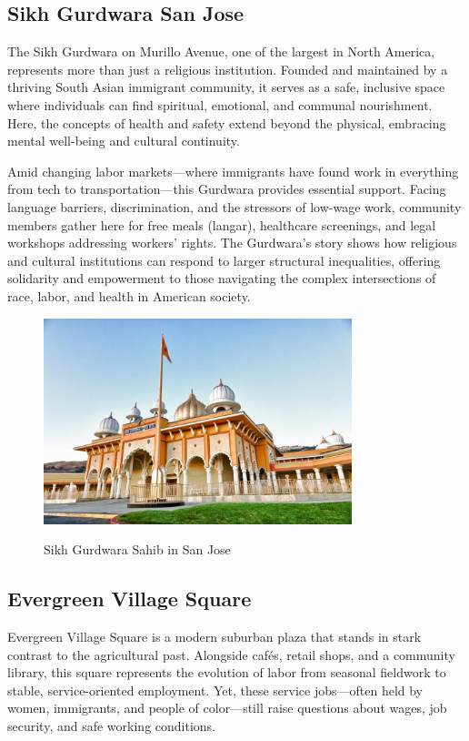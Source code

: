 \documentclass[12pt]{article}
\begin{document}
\subsection{Sikh Gurdwara San Jose}

The Sikh Gurdwara on Murillo Avenue, one of the largest in North America, represents more than just a religious institution. Founded and maintained by a thriving South Asian immigrant community, it serves as a safe, inclusive space where individuals can find spiritual, emotional, and communal nourishment. Here, the concepts of health and safety extend beyond the physical, embracing mental well-being and cultural continuity.

Amid changing labor markets—where immigrants have found work in everything from tech to transportation—this Gurdwara provides essential support. Facing language barriers, discrimination, and the stressors of low-wage work, community members gather here for free meals (langar), healthcare screenings, and legal workshops addressing workers’ rights. The Gurdwara’s story shows how religious and cultural institutions can respond to larger structural inequalities, offering solidarity and empowerment to those navigating the complex intersections of race, labor, and health in American society.

\begin{figure}[h]
  \centering
  \includegraphics[width=0.8\textwidth]{assets/sikh_gurdwara.png}
  \caption{Sikh Gurdwara Sahib in San Jose}
  \label{fig:sikh_gurdwara}
  \cite{a2017sikh}
\end{figure}

\subsection{Evergreen Village Square}

Evergreen Village Square is a modern suburban plaza that stands in stark contrast to the agricultural past. Alongside cafés, retail shops, and a community library, this square represents the evolution of labor from seasonal fieldwork to stable, service-oriented employment. Yet, these service jobs—often held by women, immigrants, and people of color—still raise questions about wages, job security, and safe working conditions.
\end{document}
